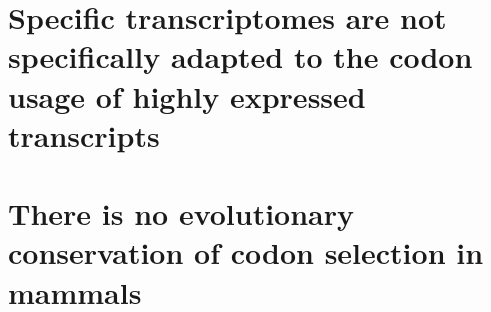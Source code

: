 \section{Specific  transcriptomes are not specifically adapted to the
codon usage of highly expressed  transcripts}

\section{There is no evolutionary conservation of codon selection in mammals}
